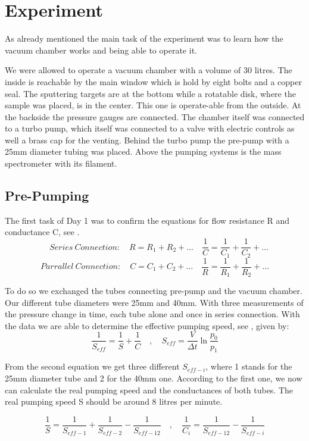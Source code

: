 \documentclass[]{article}
\begin{document}
\newpage
\section{Experiment}
As already mentioned the main task of the experiment was to learn how the vacuum chamber works and being able to operate it. 

We were allowed to operate a vacuum chamber with a volume of 30 litres. The inside is reachable by the main window which is hold by eight bolts and a copper seal. The sputtering targets are at the bottom while a rotatable disk, where the sample was placed, is in the center. This one is operate-able from the outside. At the backside the pressure gauges are connected. 
The chamber itself was connected to a turbo pump, which itself was connected to a valve with electric controls as well a brass cap for the venting. Behind the turbo pump the pre-pump with a 25mm diameter tubing was placed. Above the pumping systems is the mass spectrometer with its filament.


\subsection{Pre-Pumping}
The first task of Day 1 was to confirm the equations for flow resistance R and conductance C, see \cite[Page 91]{VacuumHandbook}. 
\[ \quad Series \: Connection: \quad
R = R_1 + R_2 + ...  \quad \frac{1}{C} = \frac{1}{C_1} + \frac{1}{C_2} + ... \]
\[ Parrallel \: Connection: \quad
C = C_1 + C_2 + ...  \quad \frac{1}{R} = \frac{1}{R_1} + \frac{1}{R_2} + ... \]

To do so we exchanged the tubes connecting pre-pump and the vacuum chamber. Our different tube diameters were 25mm and 40mm. With three measurements of the pressure change in time, each tube alone and once in series connection. With the data we are able to determine the effective pumping speed, see \cite[Page 93]{VacuumHandbook}, given by:
\[ \frac{1}{S_{eff}} = \frac{1}{S} + \frac{1}{C} \quad , \quad
S_{eff} = \frac{V}{\Delta t} \ln{ \frac{p_0}{p_1} } \]

From the second equation we get three different $S_{eff-i}$, where 1 stands for the 25mm diameter tube and 2 for the 40mm one. According to the first one, we now can calculate the real pumping speed and the conductances of both tubes. The real pumping speed S should be around 8 litres per minute.

\[ \frac{1}{S} = \frac{1}{S_{eff-1}} + \frac{1}{S_{eff-2}} -\frac{1}{S_{eff-12}} \quad , \quad
\frac{1}{C_i} = \frac{1}{S_{eff-12}} - \frac{1}{S_{eff-i}} \]
\end{document}
